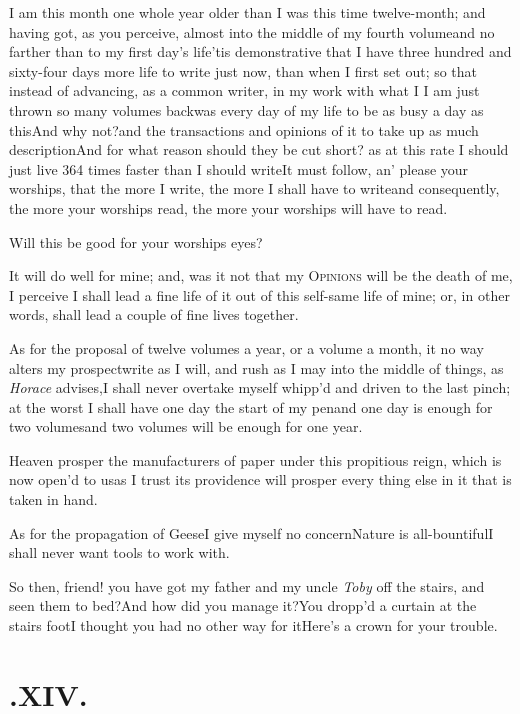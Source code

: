 \documentclass{article}
\begin{document}
I am this month one whole year older than I was this time twelve-month; and having
got, as you perceive, almost into the middle of my fourth volume\tsk and no farther
than to my first day’s life\tsk\break ’tis demonstrative that I have three hundred and
sixty-four days more life to write just now, than when I first set out;\break
so that instead of advancing, as a common writer, in my work with
what I
 I am just thrown so many volumes
back\break\tsk was every day of my
life to be as busy a day as this\tsk And why not?\tsk and the transactions and opinions
of it to take up as much description\tsk And for what reason should they be cut short?
as at this rate I should just live 364 times faster than I should write\tsk It must
follow, an’ please your worships, that the more I write, the more I shall have to
write\tsk and consequently, the more your worships read, the more your worships will
have to read.

Will this be good for your worships eyes?

It will do well for mine; and, was it not that my
\textsc{Opinions} will be the death of me, I perceive I shall
lead a fine life of it out of this self-same life of mine; or, in
other words, shall lead a couple of fine lives together.

As for the proposal of twelve volumes a year, or a volume a month, it no way alters my
prospect\tsk write as I will, and rush as I may into the middle
of things, as \textit{Horace} advises,\tsk I shall never overtake
myself whipp’d and driven to the last pinch; at the worst I
shall have one day the start of my pen\tsk and one day is enough
for two volumes\tsk and two volumes will be enough for one
year.\tsk

Heaven prosper the manufacturers of paper under this propitious
reign, which is now open’d to us\tsk as I trust its
providence will prosper every thing else in it that is taken in
hand.\tsk{}

As for the propagation of Geese\tsk I give myself no
concern\tsk Nature is all-bountiful\tsk I shall never want
tools to work with.

\tsk So then, friend! you have got my father and my uncle
\textit{Toby} off the stairs, and seen them to bed?\tsh And
how did you manage it?\tsh You dropp’d a curtain at
the stairs foot\tsk I thought you had no other way for
it\tsh Here’s a crown for your trouble.

\smallskip
\section{.\enspace XIV.}
\end{document}
